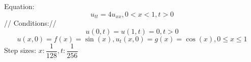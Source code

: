 Equation: $$u_{tt} = 4u_{xx}, 0 < x < 1, t > 0$$//
Conditions://
$$u(0, t) = u(1, t) = 0, t > 0$$
$$u(x, 0) = f(x) = \sin(x), u_t(x, 0) = g(x) = \cos(x), 0 \leq x \leq 1$$
Step sizes: $x: \dfrac{1}{128}, t: \dfrac{1}{256}$
